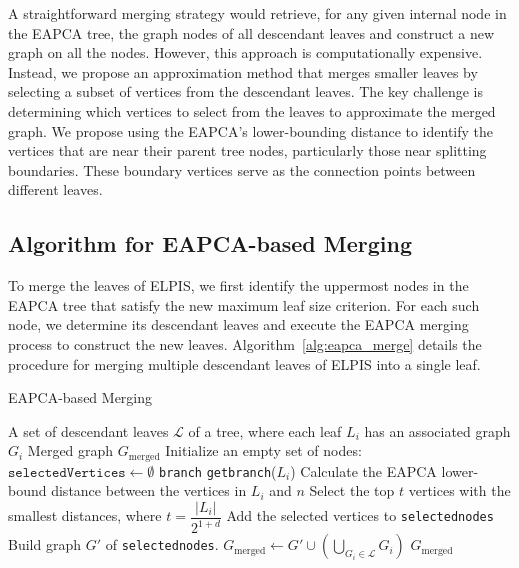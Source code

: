 A straightforward merging strategy would retrieve, for any given internal node in the EAPCA tree, the graph nodes of all descendant leaves and construct a new graph on all the nodes. However, this approach is computationally expensive. Instead, we propose an approximation method that merges smaller leaves by selecting a subset of vertices from the descendant leaves. The key challenge is determining which vertices to select from the leaves to approximate the merged graph. We propose using the EAPCA's lower-bounding distance to identify the vertices that are near their parent tree nodes, particularly those near splitting boundaries. These boundary vertices serve as the connection points between different leaves. 




\subsection{Algorithm for EAPCA-based Merging}
To merge the leaves of ELPIS, we first identify the uppermost nodes in the EAPCA tree that satisfy the new maximum leaf size criterion. For each such node, we determine its descendant leaves and execute the EAPCA merging process to construct the new leaves. Algorithm~\ref{alg:eapca_merge} details the procedure for merging multiple descendant leaves of ELPIS into a single leaf. 

\begin{algorithm}[htb]
\caption{EAPCA-based Merging}
\label{alg:eapca_merge}
\begin{algorithmic}[1]
    \Require A set of descendant leaves $\mathcal{L}$ of a tree, where each leaf $L_i$ has an associated graph $G_i$
    \Ensure Merged graph $G_{\text{merged}}$
    \State Initialize an empty set of nodes: $\texttt{selectedVertices} \gets \emptyset$
        \State \texttt{branch} \leftarrow  \texttt{getbranch}($L_i$)
            \State Calculate the EAPCA lower-bound distance between the vertices in $L_i$ and $n$
            \State Select the top $t$ vertices with the smallest distances, where $t = \dfrac{|L_i|}{2^{1 + d}}$
            \State Add the selected vertices to \texttt{selectednodes}
        \EndFor
    \EndFor
    \State Build graph $G'$ of \texttt{selectednodes}.
\State $G_{\text{merged}} \gets G' \cup \left( \bigcup_{G_i \in \mathcal{L}} G_i \right)$
    \State \Return $G_{\text{merged}}$
\end{algorithmic}
\end{algorithm}

